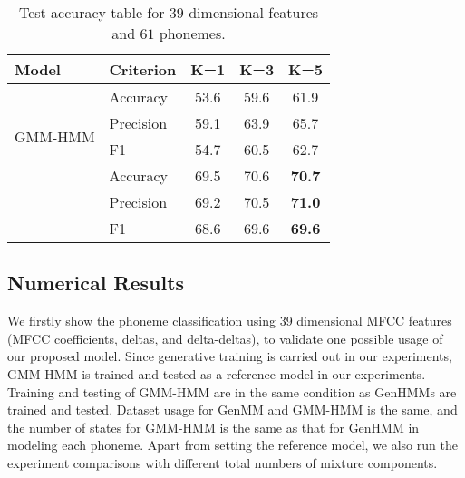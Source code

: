 \begin{table}
  \caption{Test accuracy table for $39$ dimensional features and $61$ phonemes.}\label{tab:acc-classification39f_b}
  \centering  
  \begin{tabular}{llccc} \toprule
    {Model} & Criterion & K=1 &  K=3 &  K=5
    \\ \midrule
    \multirow{4}{*}{GMM-HMM}
            & Accuracy    & 53.6 &  59.6 & 61.9  \\
            & {Precision} & 59.1 &  63.9 & 65.7 \\
            & {F1}        & 54.7 &  60.5 & 62.7\\
    \midrule
    \multirow{3}{*}{GenHMM}
            & Accuracy    & 69.5 & 70.6 & \textbf{70.7}   \\
            & {Precision} & 69.2 & 70.5 & \textbf{71.0}   \\
            & {F1}        & 68.6 & 69.6 & \textbf{69.6}   \\
    \bottomrule
  \end{tabular}
  \vspace{0.5cm}
\end{table}


\subsection{Numerical Results}

We firstly show the phoneme classification using 39 dimensional MFCC features (MFCC coefficients, deltas, and delta-deltas), to validate one possible usage of our proposed model. Since generative training is carried out in our experiments, GMM-HMM is trained and tested as a reference model in our experiments. Training and testing of GMM-HMM are in the same condition as GenHMMs are trained and tested. Dataset usage for GenMM and GMM-HMM is the same, and the number of states for GMM-HMM is the same as that for GenHMM in modeling each phoneme. Apart from setting the reference model, we also run the experiment comparisons with different total numbers of mixture components.


